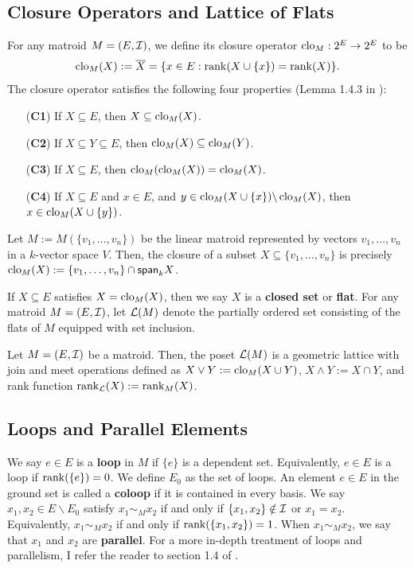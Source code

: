 \documentclass{puthesis-UG}
\begin{document}
\subsection{Closure Operators and Lattice of Flats}

\begin{defn}
	For any matroid $M = (E, \mathcal{I})$, we define its closure operator $\operatorname{clo}_M : 2^E \to 2^E$ to be 
	\[
		\operatorname{clo}_M (X) := \overline{X} = \{x \in E : \operatorname{rank} (X \cup \{x\}) = \operatorname{rank} (X) \}.
	\]
	The closure operator satisfies the following four properties (Lemma 1.4.3 in \cite{10.5555/1197093}):
	\begin{enumerate}
		\item[(\textbf{C1})] If $X \subseteq E$, then $X \subseteq \operatorname{clo}_M (X)$. 
		\item[(\textbf{C2})] If $X \subseteq Y \subseteq E$, then $\operatorname{clo}_M (X) \subseteq \operatorname{clo}_M (Y)$. 
		\item[(\textbf{C3})] If $X \subseteq E$, then $\operatorname{clo}_M (\operatorname{clo}_M(X)) = \operatorname{clo}_M(X)$. 
		\item[(\textbf{C4})] If $X \subseteq E$ and $x \in E$, and $y \in \operatorname{clo}_M(X \cup \{x\}) \backslash \operatorname{clo}_M(X)$, then $x \in \operatorname{clo}_M(X \cup \{y\})$. 
	\end{enumerate}
\end{defn}

\begin{example}
	Let $M := M(\{v_1, \ldots, v_n\})$ be the linear matroid represented by vectors $v_1, \ldots, v_n$ in a $k$-vector space $V$. Then, the closure of a subset $X \subseteq \{v_1, \ldots, v_n\}$ is precisely $\operatorname{clo}_M(X) := \{v_1, \ldots, v_n\} \cap \mathsf{span}_k X$. 
\end{example}

If $X \subseteq E$ satisfies $X = \operatorname{clo}_M(X)$, then we say $X$ is a \textbf{closed set} or \textbf{flat}. For any matroid $M = (E, \mathcal{I})$, let $\mathcal{L}(M)$ denote the partially ordered set consisting of the flats of $M$ equipped with set inclusion. 

\begin{prop}
	Let $M = (E, \mathcal{I})$ be a matroid. Then, the poset $\mathcal{L}(M)$ is a geometric lattice with join and meet operations defined as $X \vee Y := \operatorname{clo}_M(X \cup Y)$, $X \wedge Y := X \cap Y$, and rank function $\operatorname{rank}_{\mathcal{L}} (X) := \operatorname{rank}_M(X)$. 
\end{prop}


\subsection{Loops and Parallel Elements}
We say $e \in E$ is a \textbf{loop} in $M$ if $\{e\}$ is a dependent set. Equivalently, $e \in E$ is a loop if $\operatorname{rank} (\{e\}) = 0$. We define $E_0$ as the set of loops. An element $e \in E$ in the ground set is called a \textbf{coloop} if it is contained in every basis. We say $x_1, x_2 \in E \backslash E_0$ satisfy $x_1 \sim_M x_2$ if and only if $\{x_1, x_2\} \notin \mathcal{I}$ or $x_1 = x_2$. Equivalently, $x_1 \sim_M x_2$ if and only if $\operatorname{rank} (\{x_1, x_2\}) = 1$. When $x_1 \sim_M x_2$, we say that $x_1$ and $x_2$ are \textbf{parallel}. For a more in-depth treatment of loops and parallelism, I refer the reader to section 1.4 of \cite{welsh}.
\end{document}
